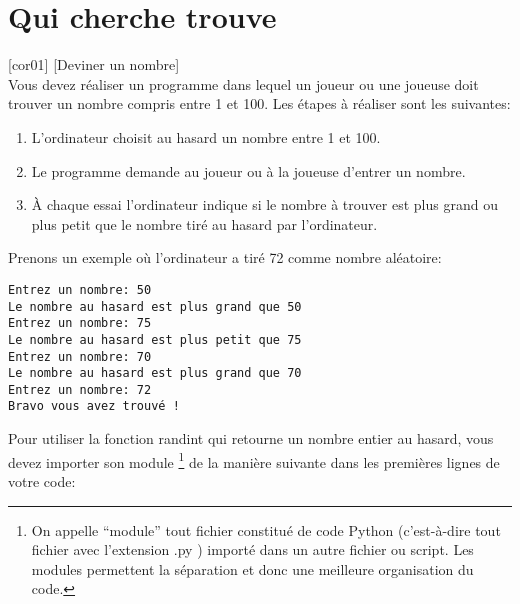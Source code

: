 \documentclass[a4paper,12pt]{article}
\newcommand{\numero}{4}                                    %
\begin{document}

\setcounter{section}{\numero}

\section{Qui cherche trouve}
[cor01]
\exo{}[Deviner un nombre]  ~\\ 
Vous devez réaliser un programme dans lequel un joueur ou une joueuse doit trouver un nombre compris entre 1 et 100. Les étapes à réaliser sont les suivantes:

\begin{enumerate}
\item L'ordinateur choisit au hasard un nombre entre 1 et 100.
\item Le programme demande au joueur ou à la joueuse d'entrer un nombre.
\item À chaque essai l'ordinateur indique si le nombre à trouver est plus grand ou plus petit que le nombre tiré au hasard par l'ordinateur.
\end{enumerate}

Prenons un exemple où l'ordinateur a tiré 72 comme nombre aléatoire:

\begin{lstlisting}
Entrez un nombre: 50
Le nombre au hasard est plus grand que 50
Entrez un nombre: 75
Le nombre au hasard est plus petit que 75
Entrez un nombre: 70
Le nombre au hasard est plus grand que 70
Entrez un nombre: 72
Bravo vous avez trouvé !
\end{lstlisting}
\hfill
	
	\vspace{4pt}
		

Pour utiliser la fonction randint qui retourne un nombre entier au hasard, vous devez importer son module \footnote{On appelle “module” tout fichier constitué de code Python (c'est-à-dire tout fichier avec l'extension .py ) importé dans un autre fichier ou script. Les modules permettent la séparation et donc une meilleure organisation du code.} de la manière suivante dans les premières lignes de votre code:
\end{document}
